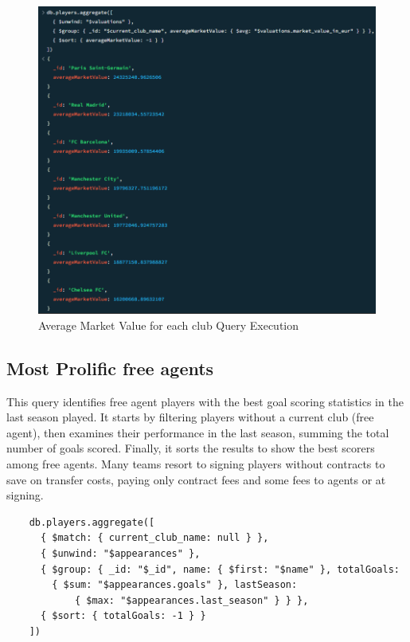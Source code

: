 \documentclass{Configuration_Files/PoliMi3i_thesis}
\begin{document}
\begin{figure}[htbp]
    \centering
    \includegraphics[scale=0.8]{Images/Queries/Average_market_value_club/amvc.png}
    \caption{Average Market Value for each club Query Execution}
\end{figure}

\subsection{Most Prolific free agents}

This query identifies free agent players with the best goal scoring statistics in the last season played. It starts by filtering players without a current club (free agent), then examines their performance in the last season, summing the total number of goals scored. Finally, it sorts the results to show the best scorers among free agents. Many teams resort to signing players without contracts to save on transfer costs, paying only contract fees and some fees to agents or at signing.

\begin{verbatim}
    db.players.aggregate([
      { $match: { current_club_name: null } },
      { $unwind: "$appearances" },
      { $group: { _id: "$_id", name: { $first: "$name" }, totalGoals: 
        { $sum: "$appearances.goals" }, lastSeason: 
            { $max: "$appearances.last_season" } } },
      { $sort: { totalGoals: -1 } }
    ])

\end{verbatim}
\end{document}
